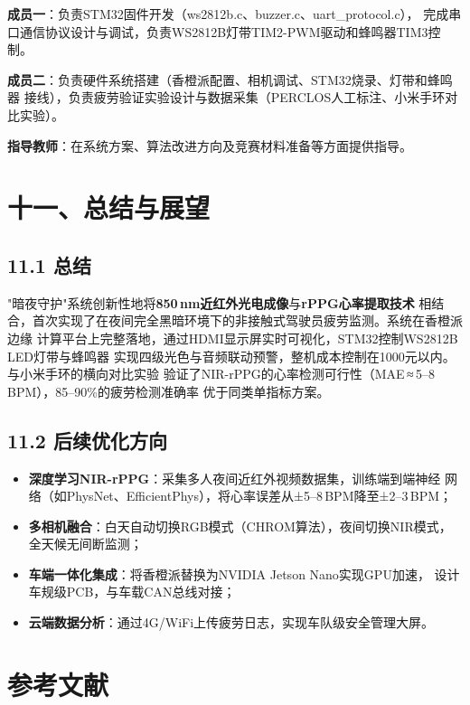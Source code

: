 \documentclass[a4paper,12pt]{article}
\begin{document}
\textbf{成员一}：负责STM32固件开发（ws2812b.c、buzzer.c、uart\_protocol.c），
完成串口通信协议设计与调试，负责WS2812B灯带TIM2-PWM驱动和蜂鸣器TIM3控制。

\textbf{成员二}：负责硬件系统搭建（香橙派配置、相机调试、STM32烧录、灯带和蜂鸣器
接线），负责疲劳验证实验设计与数据采集（PERCLOS人工标注、小米手环对比实验）。

\textbf{指导教师}：在系统方案、算法改进方向及竞赛材料准备等方面提供指导。

\section*{十一、总结与展望}

\subsection*{11.1 总结}

"暗夜守护"系统创新性地将\textbf{850\,nm近红外光电成像}与\textbf{rPPG心率提取技术}
相结合，首次实现了在夜间完全黑暗环境下的非接触式驾驶员疲劳监测。系统在香橙派边缘
计算平台上完整落地，通过HDMI显示屏实时可视化，STM32控制WS2812B LED灯带与蜂鸣器
实现四级光色与音频联动预警，整机成本控制在1000元以内。与小米手环的横向对比实验
验证了NIR-rPPG的心率检测可行性（MAE\,≈\,5--8\,BPM），85--90\%的疲劳检测准确率
优于同类单指标方案。

\subsection*{11.2 后续优化方向}

\begin{itemize}[leftmargin=2em, itemsep=3pt]
  \item \textbf{深度学习NIR-rPPG}：采集多人夜间近红外视频数据集，训练端到端神经
  网络（如PhysNet、EfficientPhys），将心率误差从±5--8\,BPM降至±2--3\,BPM；
  \item \textbf{多相机融合}：白天自动切换RGB模式（CHROM算法），夜间切换NIR模式，
  全天候无间断监测；
  \item \textbf{车端一体化集成}：将香橙派替换为NVIDIA Jetson Nano实现GPU加速，
  设计车规级PCB，与车载CAN总线对接；
  \item \textbf{云端数据分析}：通过4G/WiFi上传疲劳日志，实现车队级安全管理大屏。
\end{itemize}

\section*{参考文献}
\end{document}
